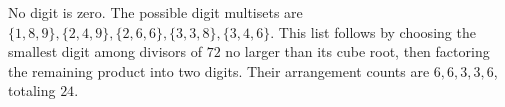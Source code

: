 No digit is zero. The possible digit multisets are $\{1,8,9\},\{2,4,9\},\{2,6,6\},\{3,3,8\},\{3,4,6\}$. This list follows by choosing the smallest digit among divisors of $72$ no larger than its cube root, then factoring the remaining product into two digits. Their arrangement counts are $6,6,3,3,6$, totaling $\boxed{24}$.
